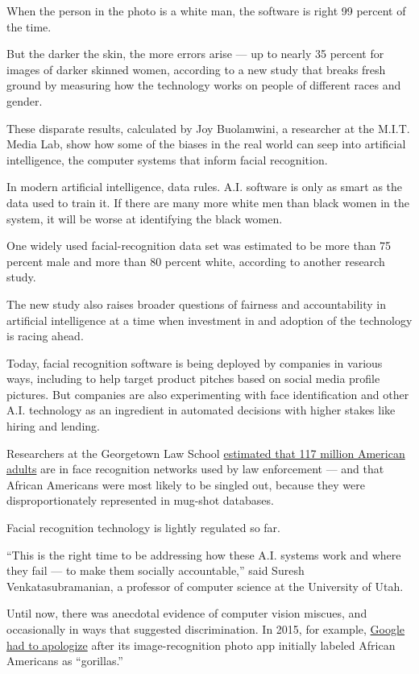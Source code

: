 When the person in the photo is a white man, the software is right 99
percent of the time.

But the darker the skin, the more errors arise --- up to nearly 35
percent for images of darker skinned women, according to a new study
that breaks fresh ground by measuring how the technology works on people
of different races and gender.

These disparate results, calculated by Joy Buolamwini, a researcher at
the M.I.T. Media Lab, show how some of the biases in the real world can
seep into artificial intelligence, the computer systems that inform
facial recognition.

In modern artificial intelligence, data rules. A.I. software is only as
smart as the data used to train it. If there are many more white men
than black women in the system, it will be worse at identifying the
black women.

One widely used facial-recognition data set was estimated to be more
than 75 percent male and more than 80 percent white, according to
another research study.

The new study also raises broader questions of fairness and
accountability in artificial intelligence at a time when investment in
and adoption of the technology is racing ahead.

Today, facial recognition software is being deployed by companies in
various ways, including to help target product pitches based on social
media profile pictures. But companies are also experimenting with face
identification and other A.I. technology as an ingredient in automated
decisions with higher stakes like hiring and lending.

Researchers at the Georgetown Law School
\href{https://www.perpetuallineup.org/}{estimated that 117 million
American adults} are in face recognition networks used by law
enforcement --- and that African Americans were most likely to be
singled out, because they were disproportionately represented in
mug-shot databases.

Facial recognition technology is lightly regulated so far.

``This is the right time to be addressing how these A.I. systems work
and where they fail --- to make them socially accountable,'' said Suresh
Venkatasubramanian, a professor of computer science at the University of
Utah.

Until now, there was anecdotal evidence of computer vision miscues, and
occasionally in ways that suggested discrimination. In 2015, for
example,
\href{https://bits.blogs.nytimes.com/2015/07/01/google-photos-mistakenly-labels-black-people-gorillas/}{Google
had to apologize} after its image-recognition photo app initially
labeled African Americans as ``gorillas.''

